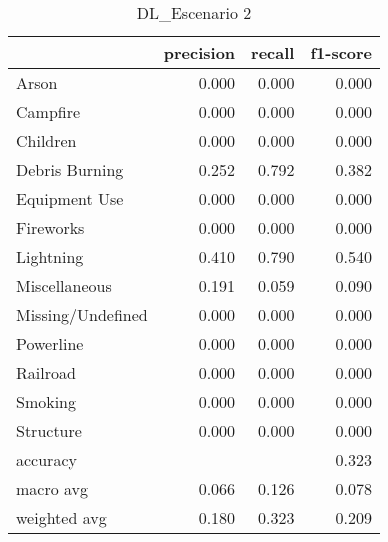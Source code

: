 \begin{table}
\centering
\caption{DL_Escenario 2}
\label{tab:Reporte de clasificación para el Escenario 2 utilizando Discriminante Lineal}
\begin{tabular}{lrrr}
\toprule
{} &  precision &  recall &  f1-score \\
\midrule
Arson             &      0.000 &   0.000 &     0.000 \\
Campfire          &      0.000 &   0.000 &     0.000 \\
Children          &      0.000 &   0.000 &     0.000 \\
Debris Burning    &      0.252 &   0.792 &     0.382 \\
Equipment Use     &      0.000 &   0.000 &     0.000 \\
Fireworks         &      0.000 &   0.000 &     0.000 \\
Lightning         &      0.410 &   0.790 &     0.540 \\
Miscellaneous     &      0.191 &   0.059 &     0.090 \\
Missing/Undefined &      0.000 &   0.000 &     0.000 \\
Powerline         &      0.000 &   0.000 &     0.000 \\
Railroad          &      0.000 &   0.000 &     0.000 \\
Smoking           &      0.000 &   0.000 &     0.000 \\
Structure         &      0.000 &   0.000 &     0.000 \\
accuracy          &            &         &     0.323 \\
macro avg         &      0.066 &   0.126 &     0.078 \\
weighted avg      &      0.180 &   0.323 &     0.209 \\
\bottomrule
\end{tabular}
\end{table}
